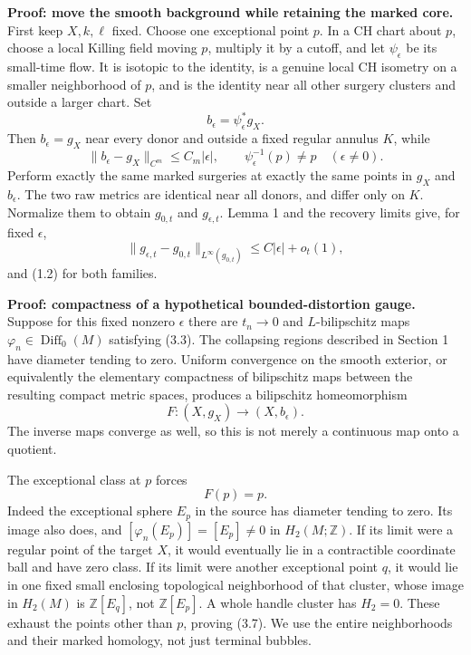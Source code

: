 \documentclass[
  10pt,
]{article}
\begin{document}
\textbf{Proof: move the smooth background while retaining the marked
core.} First keep \(X,k,\ell\) fixed. Choose one exceptional point
\(p\). In a CH chart about \(p\), choose a local Killing field moving
\(p\), multiply it by a cutoff, and let \(\psi_\epsilon\) be its
small-time flow. It is isotopic to the identity, is a genuine local CH
isometry on a smaller neighborhood of \(p\), and is the identity near
all other surgery clusters and outside a larger chart. Set \[
 b_\epsilon=\psi_\epsilon^*g_X .
\] Then \(b_\epsilon=g_X\) near every donor and outside a fixed regular
annulus \(K\), while \[
 \|b_\epsilon-g_X\|_{C^m}\le C_m|\epsilon|,\qquad
 \psi_\epsilon^{-1}(p)\ne p\quad(\epsilon\ne0).                 \tag{3.4}
\] Perform exactly the same marked surgeries at exactly the same points
in \(g_X\) and \(b_\epsilon\). The two raw metrics are identical near
all donors, and differ only on \(K\). Normalize them to obtain
\(g_{0,t}\) and \(g_{\epsilon,t}\). Lemma 1 and the recovery limits
give, for fixed \(\epsilon\), \[
 \|g_{\epsilon,t}-g_{0,t}\|_{L^\infty(g_{0,t})}
       \le C|\epsilon|+o_t(1),                               \tag{3.5}
\] and (1.2) for both families.

\textbf{Proof: compactness of a hypothetical bounded-distortion gauge.}
Suppose for this fixed nonzero \(\epsilon\) there are \(t_n\to0\) and
\(L\)-bilipschitz maps \(\varphi_n\in\operatorname{Diff}_0(M)\)
satisfying (3.3). The collapsing regions described in Section 1 have
diameter tending to zero. Uniform convergence on the smooth exterior, or
equivalently the elementary compactness of bilipschitz maps between the
resulting compact metric spaces, produces a bilipschitz homeomorphism \[
 F:(X,g_X)\longrightarrow(X,b_\epsilon).                     \tag{3.6}
\] The inverse maps converge as well, so this is not merely a continuous
map onto a quotient.

The exceptional class at \(p\) forces \[
 F(p)=p.                                                     \tag{3.7}
\] Indeed the exceptional sphere \(E_p\) in the source has diameter
tending to zero. Its image also does, and \([\varphi_n(E_p)]=[E_p]\ne0\)
in \(H_2(M;\mathbb Z)\). If its limit were a regular point of the target
\(X\), it would eventually lie in a contractible coordinate ball and
have zero class. If its limit were another exceptional point \(q\), it
would lie in one fixed small enclosing topological neighborhood of that
cluster, whose image in \(H_2(M)\) is \(\mathbb Z[E_q]\), not
\(\mathbb Z[E_p]\). A whole handle cluster has \(H_2=0\). These exhaust
the points other than \(p\), proving (3.7). We use the entire
neighborhoods and their marked homology, not just terminal bubbles.
\end{document}
